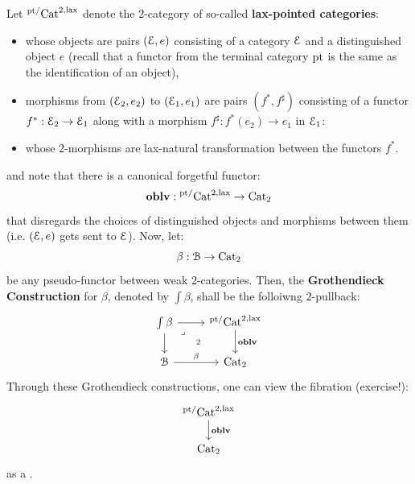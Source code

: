                 \begin{definition} \label{def: grothendieck_construction}
                    Let ${}^{\mathrm{pt}/}\mathrm{Cat}^{2, \mathrm{lax}}$ denote the $2$-category of so-called \textbf{lax-pointed categories}:
                        \begin{itemize}
                            \item whose objects are pairs $(\mathcal{E}, e)$ consisting of a category $\mathcal{E}$ and a distinguished object $e$ (recall that a functor from the terminal category $\mathrm{pt}$ is the same as the identification of an object),
                            \item morphisms from $(\mathcal{E}_2, e_2)$ to $(\mathcal{E}_1, e_1)$ are pairs $(f^*, f^{\sharp})$ consisting of a functor $f^*: \mathcal{E}_2 \to \mathcal{E}_1$ along with a morphism $f^{\sharp}: f^*(e_2) \to e_1$ in $\mathcal{E}_1$:
                            \item whose $2$-morphisms are lax-natural transformation between the functors $f^*$.
                        \end{itemize}
                    and note that there is a canonical forgetful functor:
                        $$\mathbf{oblv}: {}^{\mathrm{pt}/}\mathrm{Cat}^{2, \mathrm{lax}} \to \mathrm{Cat}_2$$
                    that disregards the choices of distinguished objects and morphisms between them (i.e. $(\mathcal{E}, e)$ gets sent to $\mathcal{E}$). Now, let:
                        $$\beta: \mathcal{B} \to \mathrm{Cat}_2$$
                    be any pseudo-functor between weak $2$-categories. Then, the \textbf{Grothendieck Construction} for $\beta$, denoted by $\int \beta$, shall be the folloiwng $2$-pullback:
                        $$
                            \begin{tikzcd}
                            	{\int \beta} & {{}^{\pt/}\Cat^{2, \lax}} \\
                            	\calB & {\Cat_2}
                            	\arrow[from=1-1, to=2-1]
                            	\arrow["\beta", from=2-1, to=2-2]
                            	\arrow["\oblv", from=1-2, to=2-2]
                            	\arrow[from=1-1, to=1-2]
                            	\arrow["2"{description}, "\lrcorner"{anchor=center, pos=0.125}, draw=none, from=1-1, to=2-2]
                            \end{tikzcd}
                        $$
                    Through these Grothendieck constructions, one can view the fibration (exercise!):
                        $$
                            \begin{tikzcd}
                            	{{}^{\pt/}\Cat^{2, \lax}} \\
                            	{\Cat_2}
                            	\arrow["\oblv", from=1-1, to=2-1]
                            \end{tikzcd}
                        $$
                    as a . 
                \end{definition}
